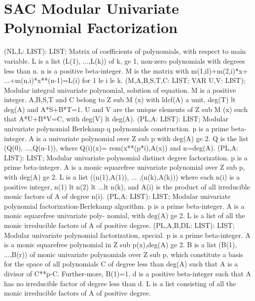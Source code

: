 \section{ SAC Modular Univariate Polynomial Factorization  } 
 (NL,L: LIST): LIST; \eproc
\bcom Matrix of coefficients of polynomials, with respect to main variable.
L is a list (L(1), ...,L(k)) of k, ge 1, non-zero polynomials with
degrees less than n.  n is a positive beta-integer.  M is the matrix
with m(1,il)+m(2,i)*x+ ...+m(n,i)*x**(n-1)=L(i) for 1 le i le
k. \ecom 
{} (M,A,B,S,T,C: LIST; VAR U,V: LIST); \eproc
\bcom Modular integral univariate polynomial, solution of equation. M is a
positive integer.  A,B,S,T and C belong to Z sub M (x) with ldcf(A) a
unit, deg(T) lt deg(A) and A*S+B*T=1.  U and V are the unique elements
of Z sub M (x) such that A*U+B*V=C, with deg(V) lt deg(A). \ecom 
{} (PL,A: LIST): LIST; \eproc
\bcom Modular univariate polynomial Berlekamp q polynomials construction.
p is a prime beta-integer.  A is a univariate polynomial over Z sub p
with deg(A) ge 2.  Q is the list (Q(0), ...,Q(n-1)), where Q(i)(x)=
rem(x**(p*i),A(x)) and n=deg(A). \ecom 
{} (PL,A: LIST): LIST; \eproc
\bcom Modular univariate polynomial distinct degree factorization. p is
a prime beta-integer.  A is a monic squarefree univariate polynomial
over Z sub p, with deg(A) ge 2.  L is a list ((n(1),A(1)), ...
,(n(k),A(k))) where each n(i) is a positive integer, n(1) lt
n(2) lt ...lt n(k), and A(i) is the product of all irreducible monic
factors of A of degree n(i). \ecom 
{} (PL,A: LIST): LIST; \eproc
\bcom Modular univariate polynomial factorization-Berlekamp algorithm.
p is a prime beta-integer.  A is a monic squarefree univariate poly-
nomial, with deg(A) ge 2.  L is a list of all the monic irreducible
factors of A of positive degree. \ecom 
{} (PL,A,B,DL: LIST): LIST; \eproc
\bcom Modular univariate polynomial factorization, special. p is a prime
beta-integer. A is a monic squarefree polynomial in Z sub p(x),deg(A)
ge 2.  B is a list (B(1), ...,B(r)) of monic univariate polynomials
over Z sub p, which constitute a basis for the space of all polynomials
C of degree less than deg(A) such that A is a divisor of C**p-C.
Further-more, B(1)=1.  d is a positive beta-integer such that A has
no irreducible factor of degree less than d.  L is a list
consisting of all the monic irreducible factors of A of positive
degree. \ecom 
